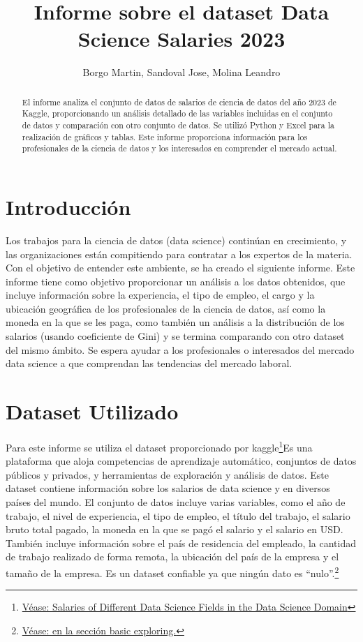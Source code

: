 \documentclass{article}
\title{Informe sobre el dataset Data Science Salaries 2023}
\author{Borgo Martin, Sandoval Jose, Molina Leandro}
\begin{document}
	
	\maketitle
	\begin{abstract}
		El informe analiza el conjunto de datos de salarios de ciencia de datos del año 2023 de Kaggle, proporcionando un análisis detallado de las variables incluidas en el conjunto de datos y comparación con otro conjunto de datos. Se utilizó Python y Excel para la realización de gráficos y tablas. Este informe proporciona información para los profesionales de la ciencia de datos y los interesados en comprender el mercado actual.
	\end{abstract}
	\pagebreak
	\vspace{-20pt}
	
	\noindent
	\tableofcontents
	\pagebreak
	\section{Introducción}
	Los trabajos para la ciencia de datos (data science) continúan en crecimiento, y las organizaciones están compitiendo para contratar a los expertos de la materia. Con el objetivo de entender este ambiente, se ha creado el siguiente informe. Este informe tiene como objetivo proporcionar un análisis a los datos obtenidos, que incluye información sobre la experiencia, el tipo de empleo, el cargo y la ubicación geográfica de los profesionales de la ciencia de datos, así como la moneda en la que se les paga, como también un análisis a la distribución de los salarios (usando coeficiente de Gini) y se termina comparando con otro dataset del mismo ámbito. Se espera ayudar a los profesionales o interesados del mercado data science a que comprendan las tendencias del mercado laboral.
	\section{Dataset Utilizado}
	Para este informe se utiliza el dataset proporcionado por kaggle\footnote{\href{https://www.kaggle.com/datasets/arnabchaki/data-science-salaries-2023}{Véase: Salaries of Different Data Science Fields in the Data Science Domain}}Es una plataforma que aloja competencias de aprendizaje automático, conjuntos de datos públicos y privados, y herramientas de exploración y análisis de datos. Este dataset contiene información sobre los salarios de data science y en diversos países del mundo. El conjunto de datos incluye varias variables, como el año de trabajo, el nivel de experiencia, el tipo de empleo, el título del trabajo, el salario bruto total pagado, la moneda en la que se pagó el salario y el salario en USD. También incluye información sobre el país de residencia del empleado, la cantidad de trabajo realizado de forma remota, la ubicación del país de la empresa y el tamaño de la empresa. Es un dataset confiable ya que ningún dato es “nulo”.\footnote{ \href{https://www.kaggle.com/code/mudassarshaheen/data-science-salaries-eda-visualization}{Véase: en la sección basic exploring.}}
	
\end{document}
